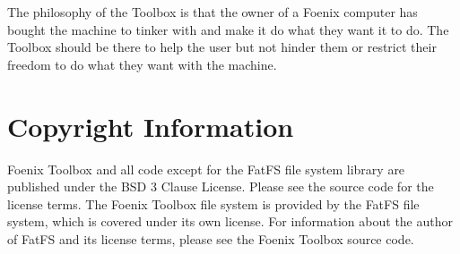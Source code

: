 The philosophy of the Toolbox is that the owner of a Foenix computer has bought the machine to tinker with and make it do what they want it to do. The Toolbox should be there to help the user but not hinder them or restrict their freedom to do what they want with the machine.

\section*{Copyright Information}
Foenix Toolbox and all code except for the FatFS file system library are published under the BSD 3 Clause License. Please see the source code for the license terms. The Foenix Toolbox file system is provided by the FatFS file system, which is covered under its own license. For information about the author of FatFS and its license terms, please see the Foenix Toolbox source code.